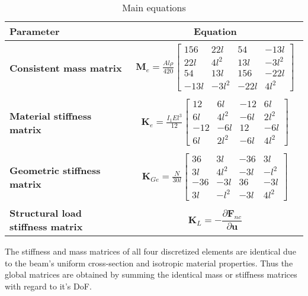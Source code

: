 \documentclass[12pt]{article}
\begin{document}
\begin{table}[h]
\centering
\caption{Main equations}
\label{tab:important_equations}
\renewcommand{\arraystretch}{1.2}
\begin{tabular}{lc}
\textbf{Parameter} & \textbf{Equation} \\
\hline
\textbf{Consistent mass matrix} &  \parbox{10cm}{\begin{align} \textbf{M}_e = \frac{Al\rho}{420} \begin{bmatrix}
156 & 22l & 54 & -13l \\
22l & 4l^2 & 13l & -3l^2 \\
54 & 13l & 156 & -22l \\
-13l & -3l^2 & -22l & 4l^2
\end{bmatrix}  \end{align}} \\

\textbf{Material stiffness matrix} & \parbox{10cm}{\begin{align} \textbf{K}_e = \frac{I_1El^3}{12} \begin{bmatrix}
12 & 6l & -12 & 6l \\
6l & 4l^2 & -6l & 2l^2 \\
-12 & -6l & 12 & -6l \\
6l & 2l^2 & -6l & 4l^2
\end{bmatrix}  \end{align}} \\

\textbf{Geometric stiffness matrix} & \parbox{10cm}{\begin{align}
\textbf{K}_{Ge} = \frac{N}{30l} \begin{bmatrix}
36 & 3l & -36 & 3l \\
3l & 4l^2 & -3l & -l^2 \\
-36 & -3l & 36 & -3l \\
3l & -l^2 & -3l & 4l^2
\end{bmatrix}
\end{align}}  \\

\textbf{Structural load stiffness matrix} & \parbox{10cm}{\begin{align}
\label{eq:K_L}
\textbf{K}_{L} = -\dfrac{\partial \textbf{F}_{nc}}{\partial \textbf{u}}
\end{align}}  \\

\end{tabular}
\end{table}
\noindent The stiffness and mass matrices of all four discretized elements are identical due to the beam's uniform cross-section and isotropic material properties. Thus the global matrices are obtained by summing the identical mass or stiffness matrices with regard to it's DoF.
\end{document}
